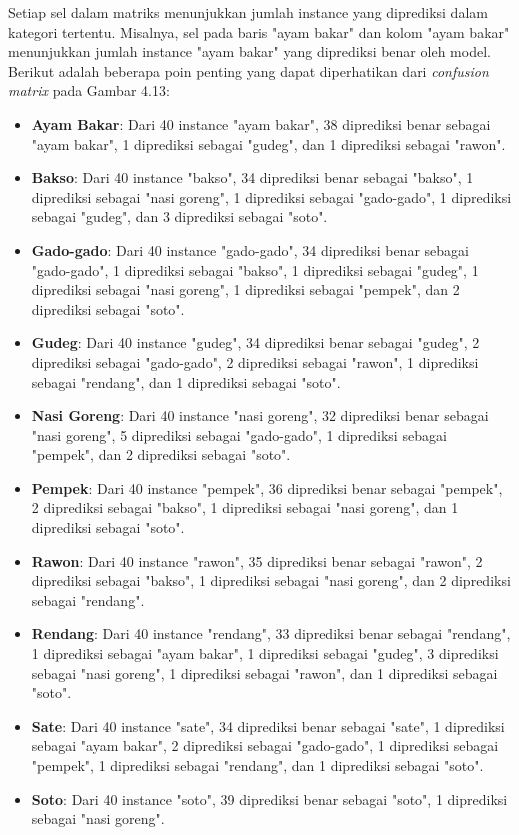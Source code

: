 Setiap sel dalam matriks menunjukkan jumlah instance yang diprediksi dalam kategori tertentu. Misalnya, sel pada baris "ayam bakar" dan kolom "ayam bakar" menunjukkan jumlah instance "ayam bakar" yang diprediksi benar oleh model. Berikut adalah beberapa poin penting yang dapat diperhatikan dari \textit{confusion matrix} pada Gambar 4.13:
\begin{itemize}
    \item \textbf{Ayam Bakar}: Dari 40 instance "ayam bakar", 38 diprediksi benar sebagai "ayam bakar", 1 diprediksi sebagai "gudeg", dan 1 diprediksi sebagai "rawon".
    \item \textbf{Bakso}: Dari 40 instance "bakso", 34 diprediksi benar sebagai "bakso", 1 diprediksi sebagai "nasi goreng", 1 diprediksi sebagai "gado-gado", 1 diprediksi sebagai "gudeg", dan 3 diprediksi sebagai "soto".
    \item \textbf{Gado-gado}: Dari 40 instance "gado-gado", 34 diprediksi benar sebagai "gado-gado", 1 diprediksi sebagai "bakso", 1 diprediksi sebagai "gudeg", 1 diprediksi sebagai "nasi goreng", 1 diprediksi sebagai "pempek", dan 2 diprediksi sebagai "soto".
    \item \textbf{Gudeg}: Dari 40 instance "gudeg", 34 diprediksi benar sebagai "gudeg", 2 diprediksi sebagai "gado-gado", 2 diprediksi sebagai "rawon", 1 diprediksi sebagai "rendang", dan 1 diprediksi sebagai "soto".
    \item \textbf{Nasi Goreng}: Dari 40 instance "nasi goreng", 32 diprediksi benar sebagai "nasi goreng", 5 diprediksi sebagai "gado-gado", 1 diprediksi sebagai "pempek", dan 2 diprediksi sebagai "soto".
    \item \textbf{Pempek}: Dari 40 instance "pempek", 36 diprediksi benar sebagai "pempek", 2 diprediksi sebagai "bakso", 1 diprediksi sebagai "nasi goreng", dan 1 diprediksi sebagai "soto".
    \item \textbf{Rawon}: Dari 40 instance "rawon", 35 diprediksi benar sebagai "rawon", 2 diprediksi sebagai "bakso", 1 diprediksi sebagai "nasi goreng", dan 2 diprediksi sebagai "rendang".
    \item \textbf{Rendang}: Dari 40 instance "rendang", 33 diprediksi benar sebagai "rendang", 1 diprediksi sebagai "ayam bakar", 1 diprediksi sebagai "gudeg", 3 diprediksi sebagai "nasi goreng", 1 diprediksi sebagai "rawon", dan 1 diprediksi sebagai "soto".
    \item \textbf{Sate}: Dari 40 instance "sate", 34 diprediksi benar sebagai "sate", 1 diprediksi sebagai "ayam bakar", 2 diprediksi sebagai "gado-gado", 1 diprediksi sebagai "pempek", 1 diprediksi sebagai "rendang", dan 1 diprediksi sebagai "soto".
    \item \textbf{Soto}: Dari 40 instance "soto", 39 diprediksi benar sebagai "soto", 1 diprediksi sebagai "nasi goreng".
\end{itemize}

